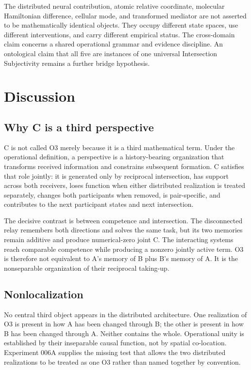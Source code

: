 \documentclass[11pt,a4paper]{article}
\begin{document}
The distributed neural contribution, atomic relative coordinate, molecular Hamiltonian difference, cellular mode, and transformed mediator are not asserted to be mathematically identical objects. They occupy different state spaces, use different interventions, and carry different empirical status. The cross-domain claim concerns a shared operational grammar and evidence discipline. An ontological claim that all five are instances of one universal Intersection Subjectivity remains a further bridge hypothesis.

\section{Discussion}

\subsection{Why C is a third perspective}

C is not called O3 merely because it is a third mathematical term. Under the operational definition, a perspective is a history-bearing organization that transforms received information and constrains subsequent formation. C satisfies that role jointly: it is generated only by reciprocal intersection, has support across both receivers, loses function when either distributed realization is treated separately, changes both participants when removed, is pair-specific, and contributes to the next participant states and next intersection.

The decisive contrast is between competence and intersection. The disconnected relay remembers both directions and solves the same task, but its two memories remain additive and produce numerical-zero joint C. The interacting systems reach comparable competence while producing a nonzero jointly active term. O3 is therefore not equivalent to A's memory of B plus B's memory of A. It is the nonseparable organization of their reciprocal taking-up.

\subsection{Nonlocalization}

No central third object appears in the distributed architecture. One realization of O3 is present in how A has been changed through B; the other is present in how B has been changed through A. Neither contains the whole. Operational unity is established by their inseparable causal function, not by spatial co-location. Experiment 006A supplies the missing test that allows the two distributed realizations to be treated as one O3 rather than named together by convention.
\end{document}
